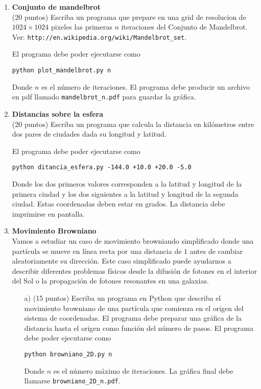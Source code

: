 \documentclass{article}
\begin{document}
\begin{enumerate}
\item
{\bf Conjunto de mandelbrot}\\
(20 puntos)
Escriba un programa que prepare en una grid de resolucion de
$1024\times 1024$ pixeles las primeras $n$ iteraciones del
Conjunto de
Mandelbrot. Ver: \verb"http://en.wikipedia.org/wiki/Mandelbrot_set". 

El programa debe poder ejecutarse como

\begin{verbatim}
python plot_mandelbrot.py n
\end{verbatim}
Donde $n$ es el n\'umero de iteraciones. El programa debe producir un
archivo en pdf llamado \verb"mandelbrot_n.pdf" para guardar la
gr\'afica. 

\item 
{\bf Distancias sobre la esfera}\\
(20 puntos)
Escriba un programa que calcula la distancia en kil\'ometros entre dos pares de
ciudades dada su longitud y latitud.

El programa debe poder ejecutarse como
\begin{verbatim}
python ditancia_esfera.py -144.0 +10.0 +20.0 -5.0
\end{verbatim}

Donde los dos primeros valores corresponden a la latitud y longitud de
la primera ciudad y los dos siguientes a la latitud y
longitud de la segunda ciudad. Estas coordenadas deben estar en
grados. La distancia debe imprimirse en pantalla.

\item
{\bf Movimiento Browniano}\\

Vamos a estudiar un caso de movimiento browniando simplificado donde
una part\'icula se mueve en l\'inea recta por una distancia de $1$
antes de cambiar aleatoriamente su direcci\'on. Este caso simplificado
puede ayudarnos a describir diferentes problemas f\'isicos desde la
difusi\'on de fotones en el interior del Sol o la propagaci\'on de
fotones resonantes en una galaxias.

\begin{itemize}
\item[a)] (15 puntos) Escriba un programa en Python que describa el movimiento
  browniano de una part\'icula que comienza en el origen del sistema
  de coordenadas. El programa debe preparar una gr\'afica de la distancia
  hasta el origen como funci\'on del n\'umero de pasos. 
El programa debe poder ejecutarse como
\begin{verbatim}
python browniano_2D.py n
\end{verbatim}
Donde $n$ es el n\'umero m\'aximo de iteraciones. La gr\'afica final
debe llamarse \verb"browniano_2D_n.pdf".


\end{itemize}
\end{enumerate}
\end{document}
